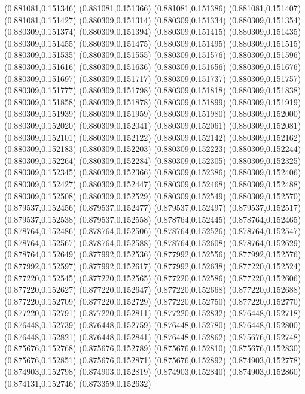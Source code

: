 (0.881081,0.151346)
(0.881081,0.151366)
(0.881081,0.151386)
(0.881081,0.151407)
(0.881081,0.151427)
(0.880309,0.151314)
(0.880309,0.151334)
(0.880309,0.151354)
(0.880309,0.151374)
(0.880309,0.151394)
(0.880309,0.151415)
(0.880309,0.151435)
(0.880309,0.151455)
(0.880309,0.151475)
(0.880309,0.151495)
(0.880309,0.151515)
(0.880309,0.151535)
(0.880309,0.151555)
(0.880309,0.151576)
(0.880309,0.151596)
(0.880309,0.151616)
(0.880309,0.151636)
(0.880309,0.151656)
(0.880309,0.151676)
(0.880309,0.151697)
(0.880309,0.151717)
(0.880309,0.151737)
(0.880309,0.151757)
(0.880309,0.151777)
(0.880309,0.151798)
(0.880309,0.151818)
(0.880309,0.151838)
(0.880309,0.151858)
(0.880309,0.151878)
(0.880309,0.151899)
(0.880309,0.151919)
(0.880309,0.151939)
(0.880309,0.151959)
(0.880309,0.151980)
(0.880309,0.152000)
(0.880309,0.152020)
(0.880309,0.152041)
(0.880309,0.152061)
(0.880309,0.152081)
(0.880309,0.152101)
(0.880309,0.152122)
(0.880309,0.152142)
(0.880309,0.152162)
(0.880309,0.152183)
(0.880309,0.152203)
(0.880309,0.152223)
(0.880309,0.152244)
(0.880309,0.152264)
(0.880309,0.152284)
(0.880309,0.152305)
(0.880309,0.152325)
(0.880309,0.152345)
(0.880309,0.152366)
(0.880309,0.152386)
(0.880309,0.152406)
(0.880309,0.152427)
(0.880309,0.152447)
(0.880309,0.152468)
(0.880309,0.152488)
(0.880309,0.152508)
(0.880309,0.152529)
(0.880309,0.152549)
(0.880309,0.152570)
(0.879537,0.152456)
(0.879537,0.152477)
(0.879537,0.152497)
(0.879537,0.152517)
(0.879537,0.152538)
(0.879537,0.152558)
(0.878764,0.152445)
(0.878764,0.152465)
(0.878764,0.152486)
(0.878764,0.152506)
(0.878764,0.152526)
(0.878764,0.152547)
(0.878764,0.152567)
(0.878764,0.152588)
(0.878764,0.152608)
(0.878764,0.152629)
(0.878764,0.152649)
(0.877992,0.152536)
(0.877992,0.152556)
(0.877992,0.152576)
(0.877992,0.152597)
(0.877992,0.152617)
(0.877992,0.152638)
(0.877220,0.152524)
(0.877220,0.152545)
(0.877220,0.152565)
(0.877220,0.152586)
(0.877220,0.152606)
(0.877220,0.152627)
(0.877220,0.152647)
(0.877220,0.152668)
(0.877220,0.152688)
(0.877220,0.152709)
(0.877220,0.152729)
(0.877220,0.152750)
(0.877220,0.152770)
(0.877220,0.152791)
(0.877220,0.152811)
(0.877220,0.152832)
(0.876448,0.152718)
(0.876448,0.152739)
(0.876448,0.152759)
(0.876448,0.152780)
(0.876448,0.152800)
(0.876448,0.152821)
(0.876448,0.152841)
(0.876448,0.152862)
(0.875676,0.152748)
(0.875676,0.152768)
(0.875676,0.152789)
(0.875676,0.152810)
(0.875676,0.152830)
(0.875676,0.152851)
(0.875676,0.152871)
(0.875676,0.152892)
(0.874903,0.152778)
(0.874903,0.152798)
(0.874903,0.152819)
(0.874903,0.152840)
(0.874903,0.152860)
(0.874131,0.152746)
(0.873359,0.152632)
